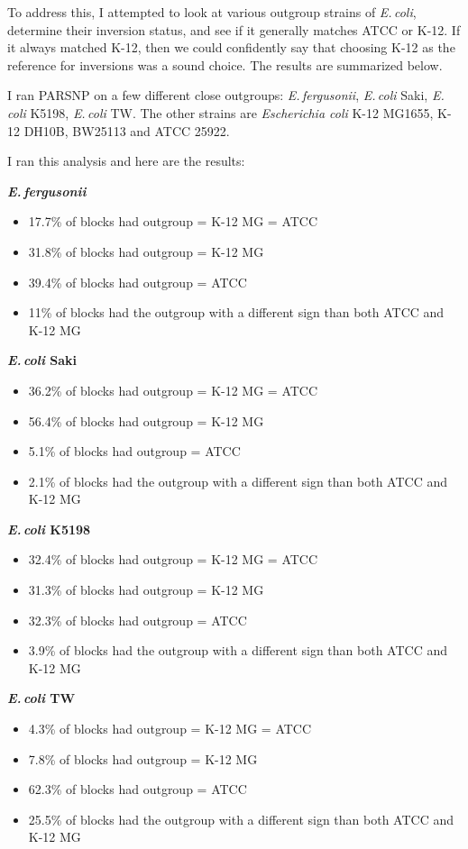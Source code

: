 \documentclass[12pt]{article}
\newcommand{\efer}{\textit{E.\,fergusonii}\xspace}
\newcommand{\ecol}{\textit{E.\,coli}\xspace}
\newcommand{\ecoli}{\textit{Escherichia coli}\xspace}
\begin{document}
To address this, I attempted to look at various outgroup strains of \ecol, determine their inversion status, and see if it generally matches ATCC or K-12. If it always matched K-12, then we could confidently say that choosing K-12 as the reference for inversions was a sound choice. The results are summarized below.

I ran PARSNP on a few different close outgroups: \efer, \ecol Saki, \ecol K5198, \ecol TW. 
The other strains are \ecoli K-12 MG1655, K-12 DH10B, BW25113 and ATCC 25922.

I ran this analysis and here are the results:

\textbf{\efer}
\begin{itemize}
	\item 17.7\% of blocks had outgroup = K-12 MG = ATCC
	\item 31.8\% of blocks had outgroup = K-12 MG
	\item 39.4\% of blocks had outgroup = ATCC
	\item 11\% of blocks had the outgroup with a different sign than both ATCC and K-12 MG
\end{itemize}

\textbf{\ecol Saki}
\begin{itemize}
	\item 36.2\% of blocks had outgroup = K-12 MG = ATCC
	\item 56.4\% of blocks had outgroup = K-12 MG
	\item 5.1\% of blocks had outgroup = ATCC
	\item 2.1\% of blocks had the outgroup with a different sign than both ATCC and K-12 MG
\end{itemize}

\textbf{\ecol K5198}
\begin{itemize}
	\item 32.4\% of blocks had outgroup = K-12 MG = ATCC
	\item 31.3\% of blocks had outgroup = K-12 MG
	\item 32.3\% of blocks had outgroup = ATCC
	\item 3.9\% of blocks had the outgroup with a different sign than both ATCC and K-12 MG
\end{itemize}

\textbf{\ecol TW}
\begin{itemize}
	\item 4.3\% of blocks had outgroup = K-12 MG = ATCC
	\item 7.8\% of blocks had outgroup = K-12 MG
	\item 62.3\% of blocks had outgroup = ATCC
	\item 25.5\% of blocks had the outgroup with a different sign than both ATCC and K-12 MG
\end{itemize}
\end{document}
